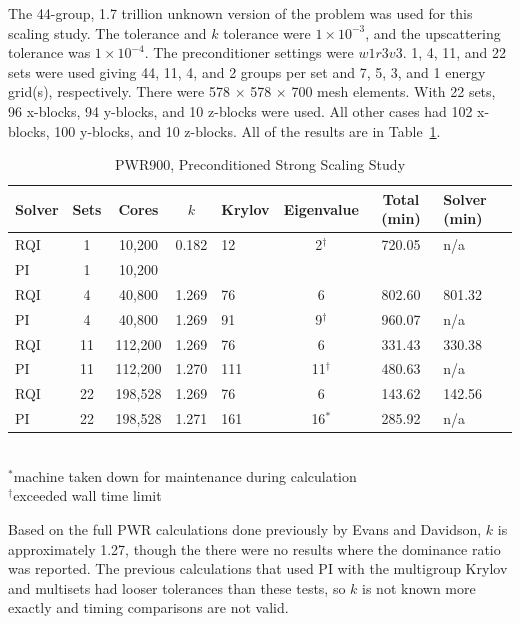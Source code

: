 The 44-group, 1.7 trillion unknown version of the problem was used for this scaling study. The tolerance and $k$ tolerance were $1 \times 10^{-3}$, and the upscattering tolerance was $1 \times 10^{-4}$. The preconditioner settings were $w1r3v3$. 1, 4, 11, and 22 sets were used giving 44, 11, 4, and 2 groups per set and 7, 5, 3, and 1 energy grid(s), respectively. There were 578 $\times$ 578 $\times$ 700 mesh elements. With 22 sets, 96 x-blocks, 94 y-blocks, and 10 z-blocks were used. All other cases had 102 x-blocks, 100 y-blocks, and 10 z-blocks. All of the results are in Table~\ref{table:full PWR}. 
%
\begin{table}[!h]
\caption{PWR900, Preconditioned Strong Scaling Study}
\begin{center}
\begin{tabular}{l c c c l c c l}
\hline
Solver & Sets & Cores & $k$ & Krylov & Eigenvalue & Total (min) & Solver (min)\\[0.5ex]
\hline
RQI & 1   & 10,200   & 0.182 & 12    & 2$^{\dag}$ & 720.05 & n/a \\
PI    & 1   & 10,200   &  &  &       &  &  \\
RQI & 4   & 40,800   & 1.269 & 76   &  6               & 802.60 & 801.32 \\
PI    & 4   & 40,800   & 1.269 & 91   & 9$^{\dag}$       & 960.07 & n/a \\
RQI & 11 & 112,200 & 1.269 & 76   & 6                & 331.43 & 330.38 \\
PI    & 11 & 112,200 & 1.270 & 111 & 11$^{\dag}$ & 480.63 & n/a \\
RQI & 22 & 198,528 & 1.269 & 76   & 6                & 143.62 & 142.56 \\
PI    & 22 & 198,528 & 1.271 & 161 & 16$^{*}$      & 285.92 & n/a \\
\hline 
\end{tabular}\\
$^{*}$machine taken down for maintenance during calculation \\
$^{\dag}$exceeded wall time limit
\end{center}
\label{table:full PWR}
\end{table}  

Based on the full PWR calculations done previously by Evans and Davidson, $k$ is approximately 1.27, though the there were no results where the dominance ratio was reported. The previous calculations that used PI with the multigroup Krylov and multisets had looser tolerances than these tests, so $k$ is not known more exactly and timing comparisons are not valid. 

